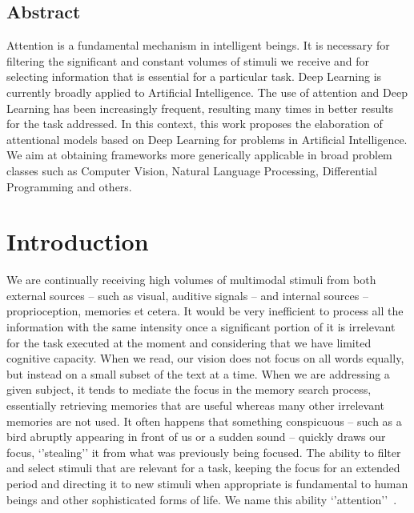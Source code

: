 \documentclass[English]{style/ic-tese-v3}
\begin{document}



\paginasiniciais

\section*{Abstract}
Attention is a fundamental mechanism in intelligent beings. It is necessary for filtering the significant and constant volumes of stimuli we receive and for selecting information that is essential for a particular task. Deep Learning is currently broadly applied to Artificial Intelligence. The use of attention and Deep Learning has been increasingly frequent, resulting many times in better results for the task addressed. In this context, this work proposes the elaboration of attentional models based on Deep Learning for problems in Artificial Intelligence. We aim at obtaining frameworks more generically applicable in broad problem classes such as Computer Vision, Natural Language Processing, Differential Programming and others.
\fimdaspaginasiniciais



\chapter{Introduction}
We are continually receiving high volumes of multimodal stimuli
from both external sources -- such as visual, auditive signals --
 and internal sources -- proprioception, memories et cetera.
It would be very inefficient to process all the information with
the same intensity once a significant portion of it is irrelevant for
the task executed at the moment and considering that we have limited cognitive capacity.
When we read, our vision does not focus on all
words equally, but instead on a small subset of the text at a time.
When we are addressing a given subject, it tends to mediate the focus
in the memory search process, essentially retrieving memories that
are useful whereas many other irrelevant memories are not used.
It often happens that something conspicuous
-- such as a bird abruptly appearing in front of us or a sudden sound --
quickly draws our focus, `'stealing'' it from what was previously
being focused.
The ability to filter and select stimuli that are relevant for a task, keeping the focus for an extended period and
directing it to new stimuli when appropriate is fundamental to
human beings and other sophisticated forms of life.
We name this ability `'attention''~\cite{ref:esther-thesis}.
\end{document}
